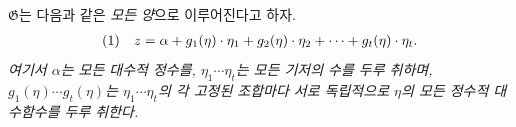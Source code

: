 
$\mathfrak G$는 다음과 같은 \emph{모든 양}으로 이루어진다고 하자.
\[
\begin{array}{@{}l@{\quad}c@{}}
(1)& z=\alpha+g_1(\eta)\cdot\eta_1+g_2(\eta)\cdot\eta_2+\cdots+g_t(\eta)\cdot\eta_t.
\end{array}
\]
\emph{여기서 $\alpha$는 모든 대수적 정수를, $\eta_1\cdots\eta_t$는 모든 기저의 수를 두루 취하며, $g_1(\eta)\cdots g_t(\eta)$는 $\eta_1\cdots\eta_t$의 각 고정된 조합마다 서로 독립적으로 $\eta$의 모든 정수적 대수함수를 두루 취한다.}
